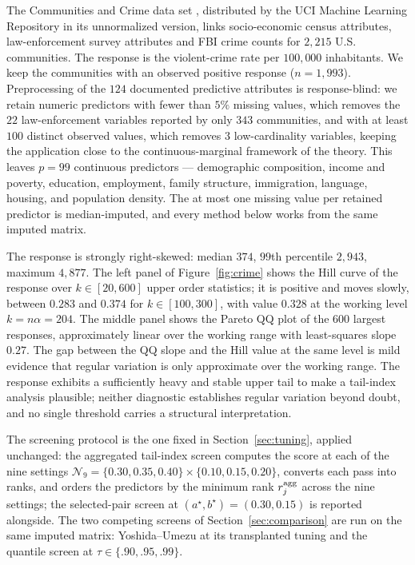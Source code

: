 \documentclass[bj,authoryear]{imsart}
\theoremstyle{plain}
\begin{document}
The Communities and Crime data set
\citep{redmond2002}, distributed by the UCI Machine Learning Repository
in its unnormalized version, links socio-economic census attributes,
law-enforcement survey attributes and FBI crime counts for $2{,}215$ U.S.
communities. The response is the violent-crime rate per $100{,}000$
inhabitants. We keep the communities with an observed positive response
($n=1{,}993$). Preprocessing of the $124$ documented predictive
attributes is response-blind: we retain numeric predictors with fewer
than $5\%$ missing values, which removes the $22$ law-enforcement
variables reported by only $343$ communities, and with at least $100$
distinct observed values, which removes $3$ low-cardinality variables,
keeping the application close to the continuous-marginal framework of
the theory. This leaves $p=99$ continuous predictors --- demographic
composition, income and poverty, education, employment, family
structure, immigration, language, housing, and population density. The
at most one missing value per retained predictor is median-imputed, and
every method below works from the same imputed matrix.

The response is strongly right-skewed: median $374$, $99$th percentile
$2{,}943$, maximum $4{,}877$. The left panel of Figure~\ref{fig:crime}
shows the Hill curve of the response over $k\in[20,600]$ upper order
statistics; it is positive and moves slowly, between $0.283$ and
$0.374$ for $k\in[100,300]$, with value $0.328$ at the working level
$k=n\alpha=204$. The middle panel shows the Pareto QQ plot of the $600$
largest responses, approximately linear over the working range with
least-squares slope $0.27$. The gap between the QQ slope and the Hill
value at the same level is mild evidence that regular variation is only
approximate over the working range. The response exhibits a
sufficiently heavy and stable upper tail to make a tail-index analysis
plausible; neither diagnostic establishes regular variation beyond
doubt, and no single threshold carries a structural interpretation.

The screening protocol is the one fixed in Section~\ref{sec:tuning},
applied unchanged: the aggregated tail-index screen computes the score
at each of the nine settings
$\mathcal N_9=\{0.30,0.35,0.40\}\times\{0.10,0.15,0.20\}$, converts
each pass into ranks, and orders the predictors by the minimum rank
$r_j^{\rm agg}$ across the nine settings; the selected-pair screen at
$(a^\star,b^\star)=(0.30,0.15)$ is reported alongside. The two
competing screens of Section~\ref{sec:comparison} are run on the same
imputed matrix: Yoshida--Umezu at its transplanted tuning and the
quantile screen at $\tau\in\{.90,.95,.99\}$.
\end{document}
